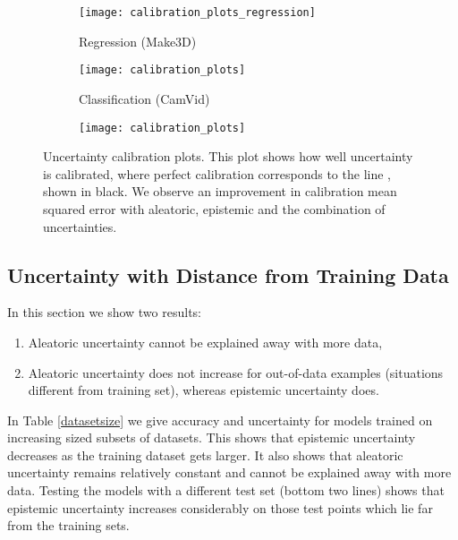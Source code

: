 \documentclass{article}
\begin{document}
\begin{figure*}[t]
\centering
    \begin{subfigure}[t]{0.33\linewidth}
        \centering
       \texttt{[image: calibration\_plots\_regression]}
        \caption{Regression (Make3D)}
    \end{subfigure}
    \begin{subfigure}[t]{0.3\linewidth}
        \centering
       \texttt{[image: calibration\_plots]}
        \caption{Classification (CamVid)}
    \end{subfigure}
    \begin{subfigure}[t]{0.32\linewidth}
        \centering
       \texttt{[image: calibration\_plots]}
\end{subfigure}
\caption{Uncertainty calibration plots. This plot shows how well uncertainty is calibrated, where perfect calibration corresponds to the line , shown in black. We observe an improvement in calibration mean squared error with aleatoric, epistemic and the combination of uncertainties.}
\label{fig:calibrationplot}
\vspace{-3mm}
\end{figure*}



\subsection{Uncertainty with Distance from Training Data}

In this section we show two results:
\begin{enumerate}[topsep=0pt,itemsep=1ex,partopsep=1ex,parsep=1ex]
\item Aleatoric uncertainty cannot be explained away with more data,
\item Aleatoric uncertainty does not increase for out-of-data examples (situations different from training set), whereas epistemic uncertainty does. \end{enumerate}

In Table \ref{datasetsize} we give accuracy and uncertainty for models trained on increasing sized subsets of datasets. This shows that epistemic uncertainty decreases as the training dataset gets larger. It also shows that aleatoric uncertainty remains relatively constant and cannot be explained away with more data.
Testing the models with a different test set (bottom two lines) shows that epistemic uncertainty increases considerably on those test points which lie far from the training sets.
\end{document}
